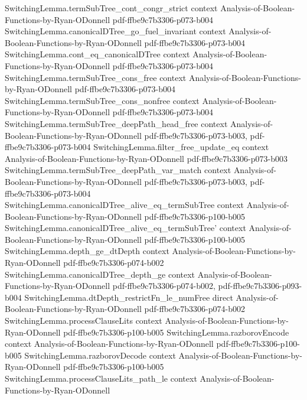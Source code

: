\begin{lemma}
\proofstep
  {SwitchingLemma.termSubTree_cont_congr_strict}
  {context}
  {Analysis-of-Boolean-Functions-by-Ryan-ODonnell}
  {pdf-ffbe9c7b3306-p073-b004}
\proofstep
  {SwitchingLemma.canonicalDTree_go_fuel_invariant}
  {context}
  {Analysis-of-Boolean-Functions-by-Ryan-ODonnell}
  {pdf-ffbe9c7b3306-p073-b004}
\proofstep
  {SwitchingLemma.cont_eq_canonicalDTree}
  {context}
  {Analysis-of-Boolean-Functions-by-Ryan-ODonnell}
  {pdf-ffbe9c7b3306-p073-b004}
\proofstep
  {SwitchingLemma.termSubTree_cons_free}
  {context}
  {Analysis-of-Boolean-Functions-by-Ryan-ODonnell}
  {pdf-ffbe9c7b3306-p073-b004}
\proofstep
  {SwitchingLemma.termSubTree_cons_nonfree}
  {context}
  {Analysis-of-Boolean-Functions-by-Ryan-ODonnell}
  {pdf-ffbe9c7b3306-p073-b004}
\proofstep
  {SwitchingLemma.termSubTree_deepPath_head_free}
  {context}
  {Analysis-of-Boolean-Functions-by-Ryan-ODonnell}
  {pdf-ffbe9c7b3306-p073-b003,
    pdf-ffbe9c7b3306-p073-b004}
\proofstep
  {SwitchingLemma.filter_free_update_eq}
  {context}
  {Analysis-of-Boolean-Functions-by-Ryan-ODonnell}
  {pdf-ffbe9c7b3306-p073-b003}
\proofstep
  {SwitchingLemma.termSubTree_deepPath_var_match}
  {context}
  {Analysis-of-Boolean-Functions-by-Ryan-ODonnell}
  {pdf-ffbe9c7b3306-p073-b003,
    pdf-ffbe9c7b3306-p073-b004}
\proofstep
  {SwitchingLemma.canonicalDTree_alive_eq_termSubTree}
  {context}
  {Analysis-of-Boolean-Functions-by-Ryan-ODonnell}
  {pdf-ffbe9c7b3306-p100-b005}
\proofstep
  {SwitchingLemma.canonicalDTree_alive_eq_termSubTree'}
  {context}
  {Analysis-of-Boolean-Functions-by-Ryan-ODonnell}
  {pdf-ffbe9c7b3306-p100-b005}
\proofstep
  {SwitchingLemma.depth_ge_dtDepth}
  {context}
  {Analysis-of-Boolean-Functions-by-Ryan-ODonnell}
  {pdf-ffbe9c7b3306-p074-b002}
\proofstep
  {SwitchingLemma.canonicalDTree_depth_ge}
  {context}
  {Analysis-of-Boolean-Functions-by-Ryan-ODonnell}
  {pdf-ffbe9c7b3306-p074-b002,
    pdf-ffbe9c7b3306-p093-b004}
\proofstep
  {SwitchingLemma.dtDepth_restrictFn_le_numFree}
  {direct}
  {Analysis-of-Boolean-Functions-by-Ryan-ODonnell}
  {pdf-ffbe9c7b3306-p074-b002}
\proofstep
  {SwitchingLemma.processClauseLits}
  {context}
  {Analysis-of-Boolean-Functions-by-Ryan-ODonnell}
  {pdf-ffbe9c7b3306-p100-b005}
\proofstep
  {SwitchingLemma.razborovEncode}
  {context}
  {Analysis-of-Boolean-Functions-by-Ryan-ODonnell}
  {pdf-ffbe9c7b3306-p100-b005}
\proofstep
  {SwitchingLemma.razborovDecode}
  {context}
  {Analysis-of-Boolean-Functions-by-Ryan-ODonnell}
  {pdf-ffbe9c7b3306-p100-b005}
\proofstep
  {SwitchingLemma.processClauseLits_path_le}
  {context}
  {Analysis-of-Boolean-Functions-by-Ryan-ODonnell}

\end{lemma}

